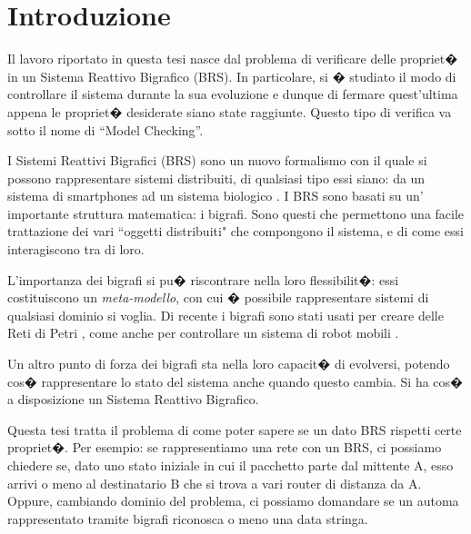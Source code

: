 \chapter{Introduzione}\label{ch:intro}
Il lavoro riportato in questa tesi nasce dal problema di verificare delle propriet� in un Sistema Reattivo Bigrafico (BRS). In particolare, si � studiato il modo di controllare il sistema durante la sua evoluzione e dunque di fermare quest'ultima appena le propriet� desiderate siano state raggiunte. Questo tipo di verifica va sotto il nome di ``Model Checking''.

I Sistemi Reattivi Bigrafici (BRS) sono un nuovo formalismo con il quale si possono rappresentare sistemi distribuiti, di qualsiasi tipo essi siano: da un sistema di smartphones
ad un sistema biologico \cite{Damgaard08ageneric}. I BRS sono basati su un' importante struttura matematica: i bigrafi. Sono questi che permettono una facile trattazione dei vari ``oggetti distribuiti" che compongono il sistema, e di come essi interagiscono tra di loro.

L'importanza dei bigrafi si pu� riscontrare nella loro flessibilit�: essi costituiscono un \emph{meta-modello}, con cui � possibile rappresentare sistemi di qualsiasi dominio si voglia. Di recente i bigrafi sono stati usati per creare delle Reti di Petri \cite{DBLP:conf/ac/Milner03}, come anche per controllare un sistema di robot mobili \cite{pereiranetworked}.

Un altro punto di forza dei bigrafi sta nella loro capacit� di evolversi, potendo cos� rappresentare lo stato del sistema anche quando questo cambia. Si ha cos� a 
disposizione un Sistema Reattivo Bigrafico. 

Questa tesi tratta il problema di come poter sapere se un dato BRS rispetti certe propriet�. Per esempio: se rappresentiamo una rete con un BRS, ci possiamo chiedere se, 
dato uno stato iniziale in cui il pacchetto parte dal mittente A, esso arrivi o meno al destinatario B che si trova a vari router di distanza da A.
Oppure, cambiando dominio del problema, ci possiamo domandare se un automa rappresentato tramite bigrafi riconosca o meno una data stringa.

